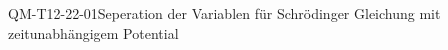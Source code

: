 
\begin{CONC}{QM-T12-22-01}{Seperation der Variablen für Schrödinger Gleichung mit zeitunabhängigem Potential}
\end{CONC}
